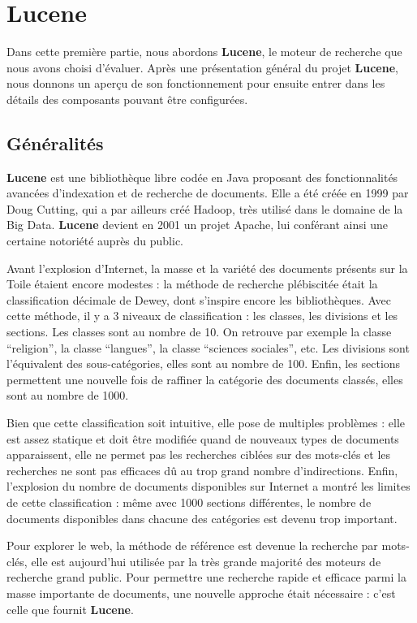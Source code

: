 \section{Lucene}
\label{section:lucene}

Dans cette première partie, nous abordons \textbf{Lucene}, le moteur de recherche que nous avons choisi d’évaluer. Après une présentation général du projet \textbf{Lucene}, nous donnons un aperçu de son fonctionnement pour ensuite entrer dans les détails des composants pouvant être configurées.

\subsection{Généralités}

\textbf{Lucene} est une bibliothèque libre codée en Java proposant des fonctionnalités avancées d’indexation et de recherche de documents. Elle a été créée en 1999 par Doug Cutting, qui a par ailleurs créé Hadoop, très utilisé dans le domaine de la Big Data. \textbf{Lucene} devient en 2001 un projet Apache, lui conférant ainsi une certaine notoriété auprès du public.

Avant l’explosion d’Internet, la masse et la variété des documents présents sur la Toile étaient encore modestes : la méthode de recherche plébiscitée était la classification décimale de Dewey, dont s’inspire encore les bibliothèques. Avec cette méthode, il y a 3 niveaux de classification : les classes, les divisions et les sections. Les classes sont au nombre de 10. On retrouve par exemple la classe “religion”, la classe “langues”, la classe “sciences sociales”, etc. Les divisions sont l’équivalent des sous-catégories, elles sont au nombre de 100. Enfin, les sections permettent une nouvelle fois de raffiner la catégorie des documents classés, elles sont au nombre de 1000.

Bien que cette classification soit intuitive, elle pose de multiples problèmes : elle est assez statique et doit être modifiée quand de nouveaux types de documents apparaissent, elle ne permet pas les recherches ciblées sur des mots-clés et les recherches ne sont pas efficaces dû au trop grand nombre d’indirections. Enfin, l’explosion du nombre de documents disponibles sur Internet a montré les limites de cette classification : même avec 1000 sections différentes, le nombre de documents disponibles dans chacune des catégories est devenu trop important.

Pour explorer le web, la méthode de référence est devenue la recherche par mots-clés, elle est aujourd’hui utilisée par la très grande majorité des moteurs de recherche grand public. Pour permettre une recherche rapide et efficace parmi la masse importante de documents, une nouvelle approche était nécessaire : c’est celle que fournit \textbf{Lucene}.

